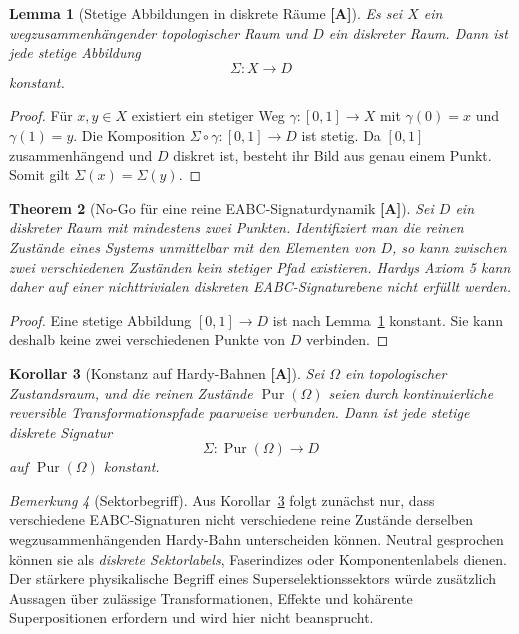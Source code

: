 \documentclass[11pt,a4paper,reqno]{amsart}
\newtheorem{theorem}{Theorem}[section]
\newtheorem{lemma}[theorem]{Lemma}
\newtheorem{corollary}[theorem]{Korollar}
\theoremstyle{definition}
\theoremstyle{remark}
\newtheorem{remark}[theorem]{Bemerkung}
\newcommand{\Pur}{\operatorname{Pur}}
\newcommand{\StatusA}{\textnormal{\textbf{[A]}}}
\begin{document}
\begin{lemma}[Stetige Abbildungen in diskrete Räume \StatusA]
\label{lem:discrete-map}
Es sei $X$ ein wegzusammenhängender topologischer Raum und $D$ ein diskreter Raum. Dann ist jede stetige Abbildung
\[
\Sigma:X\longrightarrow D
\]
konstant.
\end{lemma}

\begin{proof}
Für $x,y\in X$ existiert ein stetiger Weg $\gamma:[0,1]\to X$ mit $\gamma(0)=x$ und $\gamma(1)=y$. Die Komposition $\Sigma\circ\gamma:[0,1]\to D$ ist stetig. Da $[0,1]$ zusammenhängend und $D$ diskret ist, besteht ihr Bild aus genau einem Punkt. Somit gilt $\Sigma(x)=\Sigma(y)$.
\end{proof}

\begin{theorem}[No-Go für eine reine EABC-Signaturdynamik \StatusA]
\label{thm:no-go}
Sei $D$ ein diskreter Raum mit mindestens zwei Punkten. Identifiziert man die reinen Zustände eines Systems unmittelbar mit den Elementen von $D$, so kann zwischen zwei verschiedenen Zuständen kein stetiger Pfad existieren. Hardys Axiom 5 kann daher auf einer nichttrivialen diskreten EABC-Signaturebene nicht erfüllt werden.
\end{theorem}

\begin{proof}
Eine stetige Abbildung $[0,1]\to D$ ist nach Lemma~\ref{lem:discrete-map} konstant. Sie kann deshalb keine zwei verschiedenen Punkte von $D$ verbinden.
\end{proof}

\begin{corollary}[Konstanz auf Hardy-Bahnen \StatusA]
\label{cor:hardy-orbits}
Sei $\Omega$ ein topologischer Zustandsraum, und die reinen Zustände $\Pur(\Omega)$ seien durch kontinuierliche reversible Transformationspfade paarweise verbunden. Dann ist jede stetige diskrete Signatur
\[
\Sigma:\Pur(\Omega)\longrightarrow D
\]
auf $\Pur(\Omega)$ konstant.
\end{corollary}

\begin{remark}[Sektorbegriff]
Aus Korollar~\ref{cor:hardy-orbits} folgt zunächst nur, dass verschiedene EABC-Signaturen nicht verschiedene reine Zustände derselben wegzusammenhängenden Hardy-Bahn unterscheiden können. Neutral gesprochen können sie als \emph{diskrete Sektorlabels}, Faserindizes oder Komponentenlabels dienen. Der stärkere physikalische Begriff eines Superselektionssektors würde zusätzlich Aussagen über zulässige Transformationen, Effekte und kohärente Superpositionen erfordern und wird hier nicht beansprucht.
\end{remark}
\end{document}
